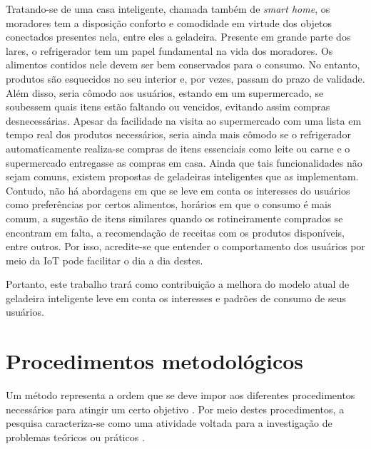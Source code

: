 Tratando-se de uma casa inteligente, chamada também de \textit{smart home}, os moradores tem a disposição conforto e comodidade em virtude dos objetos conectados presentes nela, entre eles a geladeira. Presente em grande parte dos lares, o refrigerador tem um papel fundamental na vida dos moradores. Os alimentos contidos nele devem ser bem conservados para o consumo. No entanto, produtos são esquecidos no seu interior e, por vezes, passam do prazo de validade. Além disso, seria cômodo aos usuários, estando em um supermercado, se soubessem quais itens estão faltando ou vencidos, evitando assim compras desnecessárias. Apesar da facilidade na visita ao supermercado com uma lista em tempo real dos produtos necessários, seria ainda mais cômodo se o refrigerador automaticamente realiza-se compras de itens essenciais como leite ou carne e o supermercado entregasse as compras em casa. Ainda que tais funcionalidades não sejam comuns, existem propostas de geladeiras inteligentes que as implementam. Contudo, não há abordagens em que se leve em conta os interesses do usuários como preferências por certos alimentos, horários em que o consumo é mais comum, a sugestão de itens similares quando os rotineiramente comprados se encontram em falta, a recomendação de receitas com os produtos disponíveis, entre outros. Por isso, acredite-se que entender o comportamento dos usuários por meio da IoT pode facilitar o dia a dia destes.

Portanto, este trabalho trará como contribuição a melhora do modelo atual de geladeira inteligente leve em conta os interesses e padrões de consumo de seus usuários.



\section{Procedimentos metodológicos}

Um método representa a ordem que se deve impor aos diferentes procedimentos necessários para atingir um certo objetivo \cite{Cervo2007}. Por meio destes procedimentos, a pesquisa caracteriza-se como uma atividade voltada para a investigação de problemas teóricos ou práticos \cite{Matias-Pereira2012}.

